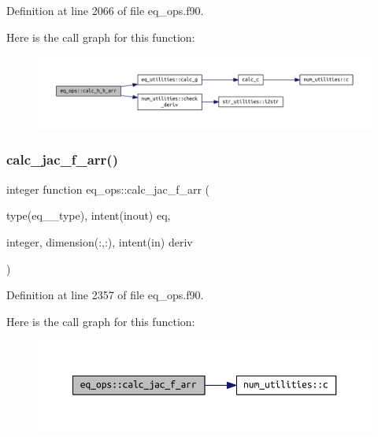 Definition at line 2066 of file eq\+\_\+ops.\+f90.

Here is the call graph for this function\+:
\nopagebreak
\begin{figure}[H]
\begin{center}
\leavevmode
\includegraphics[width=350pt]{namespaceeq__ops_a2874986e80f079d585725b46a327b9e8_cgraph}
\end{center}
\end{figure}
\mbox{\label{namespaceeq__ops_a7d429e0ee6deefac854d3398955dc73d}} 
\subsubsection{\texorpdfstring{calc\+\_\+jac\+\_\+f\+\_\+arr()}{calc\_jac\_f\_arr()}}
{\footnotesize\ttfamily integer function eq\+\_\+ops\+::calc\+\_\+jac\+\_\+f\+\_\+arr (\begin{DoxyParamCaption}\item[{type(eq\+\_\+2\+\_\+type), intent(inout)}]{eq,  }\item[{integer, dimension(\+:,\+:), intent(in)}]{deriv }\end{DoxyParamCaption})}



Definition at line 2357 of file eq\+\_\+ops.\+f90.

Here is the call graph for this function\+:
\nopagebreak
\begin{figure}[H]
\begin{center}
\leavevmode
\includegraphics[width=350pt]{namespaceeq__ops_a7d429e0ee6deefac854d3398955dc73d_cgraph}
\end{center}
\end{figure}
\mbox{\label{namespaceeq__ops_a0b0e2f58fe1133e16ff604499fa24d29}} 
